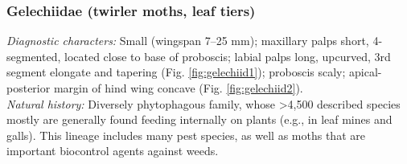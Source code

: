 \documentclass[letterpaper, 11pt]{article}
\begin{document}
\subsubsection{Gelechiidae (twirler moths, leaf tiers)}
\noindent{}\textit{Diagnostic characters:} Small (wingspan 7--25 mm); maxillary palps short, 4-segmented, located close to base of proboscis; labial palps long, upcurved, 3rd segment elongate and tapering (Fig. \ref{fig:gelechiid1}); proboscis scaly; apical-posterior margin of hind wing concave (Fig. \ref{fig:gelechiid2}).\\

\noindent{}\textit{Natural history:} Diversely phytophagous family, whose \textgreater4,500 described species mostly are generally found feeding internally on plants (e.g., in leaf mines and galls). This lineage includes many pest species, as well as moths that are important biocontrol agents against weeds.
\end{document}
